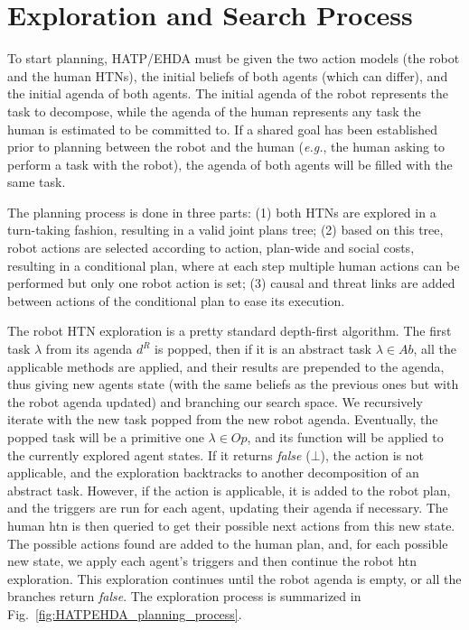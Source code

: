 \section{Exploration and Search Process}

To start planning, HATP/EHDA must be given the two action models (the robot and the human HTNs), the initial beliefs of both agents (which can differ), and the initial agenda of both agents. The initial agenda of the robot represents the task to decompose, while the agenda of the human represents any task the human is estimated to be committed to. If a shared goal has been established prior to planning between the robot and the human (\textit{e.g.}, the human asking to perform a task with the robot), the agenda of both agents will be filled with the same task.

The planning process is done in three parts: (1) both HTNs are explored in a turn-taking fashion, resulting in a valid joint plans tree; (2) based on this tree, robot actions are selected according to action, plan-wide and social costs, resulting in a conditional plan, where at each step multiple human actions can be performed but only one robot action is set; (3) causal and threat links are added between actions of the conditional plan to ease its execution.

The robot HTN exploration is a pretty standard depth-first algorithm. The first task $\lambda$ from its agenda $d^R$ is popped, then if it is an abstract task $\lambda \in Ab$, all the applicable methods are applied, and their results are prepended to the agenda, thus giving new agents state (with the same beliefs as the previous ones but with the robot agenda updated) and branching our search space. We recursively iterate with the new task popped from the new robot agenda. Eventually, the popped task will be a primitive one $\lambda \in Op$, and its function will be applied to the currently explored agent states. If it returns \textit{false} ($\bot$), the action is not applicable, and the exploration backtracks to another decomposition of an abstract task. However, if the action is applicable, it is added to the robot plan, and the triggers are run for each agent, updating their agenda if necessary. The human \acrshort{htn} is then queried to get their possible next actions from this new state. The possible actions found are added to the human plan, and, for each possible new state, we apply each agent's triggers and then continue the robot \acrshort{htn} exploration. This exploration continues until the robot agenda is empty, or all the branches return \textit{false}. The exploration process is summarized in Fig.~\ref{fig:HATPEHDA_planning_process}.

